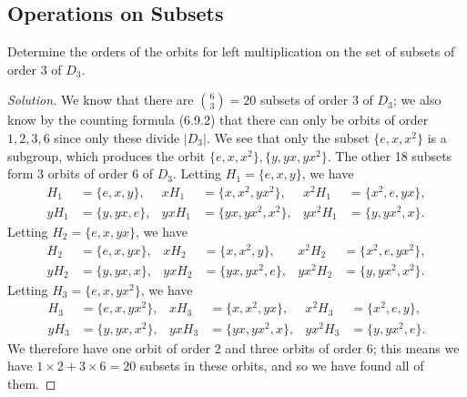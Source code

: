 \documentclass[12pt]{article}
\theoremstyle{remark}
\begin{document}
\subsection{Operations on Subsets}
\begin{problem}
  Determine the orders of the orbits for left multiplication on the set of subsets of order $3$ of $D_3$.
\end{problem}
\begin{proof}[Solution]
  We know that there are $\binom{6}{3} = 20$ subsets of order $3$ of $D_3$; we also know by the counting formula (6.9.2) that there can only be orbits of order $1,2,3,6$ since only these divide $\lvert D_3 \rvert$. We see that only the subset $\{e,x,x^2\}$ is a subgroup, which produces the orbit $\{e,x,x^2\}, \{y,yx,yx^2\}$. The other 18 subsets form 3 orbits of order $6$ of $D_3$. Letting $H_1=\{e,x,y\}$, we have
  \begin{align*}
    H_1 &= \{e,x,y\}, & xH_1 &= \{x,x^2,yx^2\}, & x^2H_1 &= \{x^2,e,yx\},\\
    yH_1 &= \{y,yx,e\}, & yxH_1 &= \{yx,yx^2,x^2\}, & yx^2H_1 &= \{y,yx^2,x\}.
  \end{align*}
  Letting $H_2 = \{e,x,yx\}$, we have
  \begin{align*}
    H_2 &= \{e,x,yx\}, & xH_2 &= \{x,x^2,y\}, & x^2H_2 &= \{x^2,e,yx^2\},\\
    yH_2 &= \{y,yx,x\}, & yxH_2 &= \{yx,yx^2,e\}, & yx^2H_2 &= \{y,yx^2,x^2\}.
  \end{align*}
  Letting $H_3 = \{e,x,yx^2\}$, we have
  \begin{align*}
    H_3 &= \{e,x,yx^2\}, & xH_3 &= \{x,x^2,yx\}, & x^2H_3 &= \{x^2,e,y\},\\
    yH_3 &= \{y,yx,x^2\}, & yxH_3 &= \{yx,yx^2,x\}, & yx^2H_3 &= \{y,yx^2,e\}.
  \end{align*}
  We therefore have one orbit of order 2 and three orbits of order 6; this means we have $1\times2 + 3\times6 = 20$ subsets in these orbits, and so we have found all of them.
\end{proof}
\end{document}
